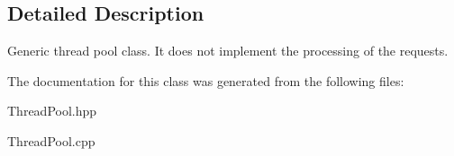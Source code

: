 \subsection{Detailed Description}
Generic thread pool class. It does not implement the processing of the requests. 

The documentation for this class was generated from the following files\+:\begin{DoxyCompactItemize}
\item 
Thread\+Pool.\+hpp\item 
Thread\+Pool.\+cpp\end{DoxyCompactItemize}

